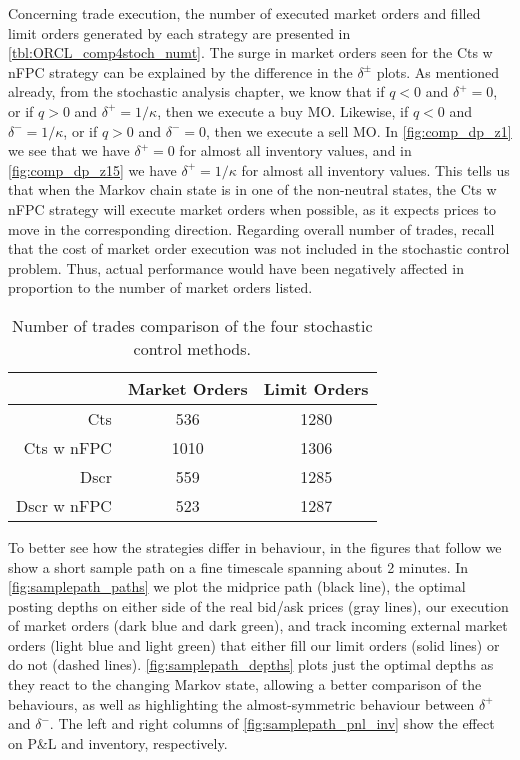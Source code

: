 Concerning trade execution, the number of executed market orders and filled limit orders generated by each strategy are presented in \autoref{tbl:ORCL_comp4stoch_numt}. The surge in market orders seen for the Cts w nFPC strategy can be explained by the difference in the $\delta^\pm$ plots. As mentioned already, from the stochastic analysis chapter, we know that if $q < 0 $ and $\delta^+ =0$, or if $q > 0$ and $\delta^+ = 1/\kappa$, then we execute a buy MO. Likewise, if $q < 0 $ and $\delta^- =1/\kappa$, or if $q > 0$ and $\delta^- = 0$, then we execute a sell MO. In \autoref{fig:comp_dp_z1} we see that we have $\delta^+ = 0$ for almost all inventory values, and in \autoref{fig:comp_dp_z15} we have  $\delta^+ = 1/\kappa$ for almost all inventory values. This tells us that when the Markov chain state is in one of the non-neutral states, the Cts w nFPC strategy will execute market orders when possible, as it expects prices to move in the corresponding direction. Regarding overall number of trades, recall that the cost of market order execution was not included in the stochastic control problem. Thus, actual performance would have been negatively affected in proportion to the number of market orders listed.
\begin{table}
\centering
{}
\begin{tabular}{@{} r *{2}{c} @{}}
\toprule
& Market Orders & Limit Orders \\
\midrule
Cts          &  536 & 1280 \\
Cts w nFPC   & 1010 & 1306 \\
Dscr         &  559 & 1285 \\
Dscr w nFPC  &  523 & 1287 \\
\bottomrule
\end{tabular}
\caption[Number of trades comparison of the four stochastic control methods]{Number of trades comparison of the four stochastic control methods.}
\label{tbl:ORCL_comp4stoch_numt}
\end{table}

To better see how the strategies differ in behaviour, in the figures that follow we show a short sample path on a fine timescale spanning about 2 minutes. In \autoref{fig:samplepath_paths} we plot the midprice path (black line), the optimal posting depths on either side of the real bid/ask prices (gray lines), our execution of market orders (dark blue and dark green), and track incoming external market orders (light blue and light green) that either fill our limit orders (solid lines) or do not (dashed lines). \autoref{fig:samplepath_depths} plots just the optimal depths as they react to the changing Markov state, allowing a better comparison of the behaviours, as well as highlighting the almost-symmetric behaviour between $\delta^+$ and $\delta^-$. The left and right columns of \autoref{fig:samplepath_pnl_inv} show the effect on P\&L and inventory, respectively. 

